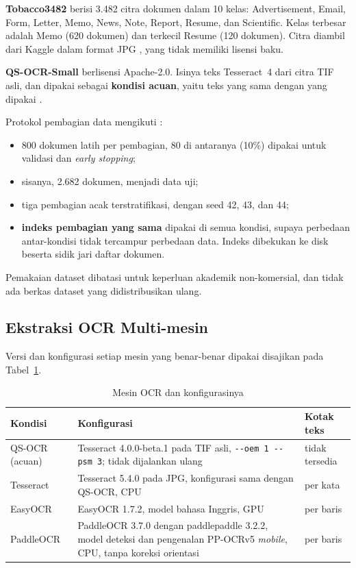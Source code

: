 \textbf{Tobacco3482} \parencite{kumar2014} berisi 3.482 citra dokumen dalam 10 kelas:
Advertisement, Email, Form, Letter, Memo, News, Note, Report, Resume, dan Scientific.
Kelas terbesar adalah Memo (620 dokumen) dan terkecil Resume (120 dokumen). Citra diambil
dari Kaggle dalam format JPG \parencite{kaggletobacco}, yang tidak memiliki lisensi baku.

\textbf{QS-OCR-Small} \parencite{qsocr} berlisensi Apache-2.0. Isinya teks Tesseract~4
dari citra TIF asli, dan dipakai sebagai \textbf{kondisi acuan}, yaitu teks yang sama
dengan yang dipakai \textcite{audebert2020}.

Protokol pembagian data mengikuti \textcite{audebert2020}:
\begin{itemize}
  \item 800 dokumen latih per pembagian, 80 di antaranya (10\%) dipakai untuk validasi
  dan \textit{early stopping};
  \item sisanya, 2.682 dokumen, menjadi data uji;
  \item tiga pembagian acak terstratifikasi, dengan seed 42, 43, dan 44;
  \item \textbf{indeks pembagian yang sama} dipakai di semua kondisi, supaya perbedaan
  antar-kondisi tidak tercampur perbedaan data. Indeks dibekukan ke disk beserta sidik
  jari daftar dokumen.
\end{itemize}
Pemakaian dataset dibatasi untuk keperluan akademik non-komersial, dan tidak ada berkas
dataset yang didistribusikan ulang.

\subsection{Ekstraksi OCR Multi-mesin}\label{sec:metode-ocr}

Versi dan konfigurasi setiap mesin yang benar-benar dipakai disajikan pada
Tabel~\ref{tab:mesin}.

\begin{table}[H]
  \centering
  \caption{Mesin OCR dan konfigurasinya}
  \label{tab:mesin}
  \fontsize{10}{12}\selectfont
  \begin{tabularx}{\textwidth}{|l|>{\raggedright\arraybackslash}X|l|}
    \hline
    \textbf{Kondisi} & \textbf{Konfigurasi} & \textbf{Kotak teks} \\ \hline
    QS-OCR (acuan) & Tesseract 4.0.0-beta.1 pada TIF asli, \texttt{-{}-oem 1 -{}-psm 3};
    tidak dijalankan ulang & tidak tersedia \\ \hline
    Tesseract & Tesseract 5.4.0 pada JPG, konfigurasi sama dengan QS-OCR, CPU &
    per kata \\ \hline
    EasyOCR & EasyOCR 1.7.2, model bahasa Inggris, GPU & per baris \\ \hline
    PaddleOCR & PaddleOCR 3.7.0 dengan paddlepaddle 3.2.2, model deteksi dan pengenalan
    PP-OCRv5 \textit{mobile}, CPU, tanpa koreksi orientasi & per baris \\ \hline
  \end{tabularx}
\end{table}

